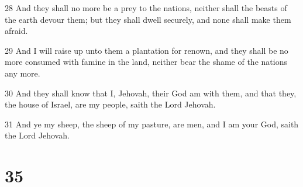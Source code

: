 \par 28 And they shall no more be a prey to the nations, neither shall the beasts of the earth devour them; but they shall dwell securely, and none shall make them afraid.
\par 29 And I will raise up unto them a plantation for renown, and they shall be no more consumed with famine in the land, neither bear the shame of the nations any more.
\par 30 And they shall know that I, Jehovah, their God am with them, and that they, the house of Israel, are my people, saith the Lord Jehovah.
\par 31 And ye my sheep, the sheep of my pasture, are men, and I am your God, saith the Lord Jehovah.

\chapter{35}

